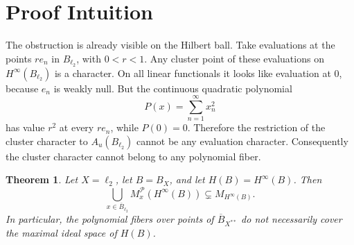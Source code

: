 \documentclass[11pt]{article}
\newtheorem{theorem}{Theorem}
\newcommand{\Ball}{B}
\newcommand{\Au}{A_u}
\newcommand{\Hinfty}{H^\infty}
\newcommand{\M}{M}
\newcommand{\PP}{\mathcal P}
\begin{document}
\section*{Proof Intuition}

The obstruction is already visible on the Hilbert ball.  Take evaluations at
the points \(r e_n\) in \(\Ball_{\ell_2}\), with \(0<r<1\).  Any cluster point
of these evaluations on \(\Hinfty(\Ball_{\ell_2})\) is a character.  On all
linear functionals it looks like evaluation at \(0\), because \(e_n\) is weakly
null.  But the continuous quadratic polynomial
\[
  P(x)=\sum_{n=1}^{\infty} x_n^2
\]
has value \(r^2\) at every \(r e_n\), while \(P(0)=0\).  Therefore the
restriction of the cluster character to \(\Au(\Ball_{\ell_2})\) cannot be any
evaluation character.  Consequently the cluster character cannot belong to any
polynomial fiber.

\begin{theorem}
Let \(X=\ell_2\), let \(\Ball=\Ball_X\), and let
\(H(\Ball)=\Hinfty(\Ball)\).  Then
\[
  \bigcup_{x\in \overline{\Ball}_{\ell_2}}
  \M_x^{\PP}(\Hinfty(\Ball))
  \subsetneq
  \M_{\Hinfty(\Ball)} .
\]
In particular, the polynomial fibers over points of
\(\overline{\Ball}_{X^{**}}\) do not necessarily cover the maximal ideal space
of \(H(\Ball)\).
\end{theorem}
\end{document}
